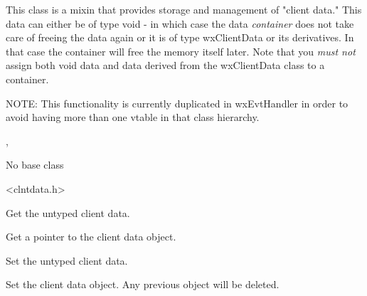 This class is a mixin that provides storage and management of "client
data." This data can either be of type void - in which case the data
{\it container} does not take care of freeing the data again
or it is of type wxClientData or its derivatives. In that case the
container will free the memory itself later.
Note that you {\it must not} assign both void data and data
derived from the wxClientData class to a container.

NOTE: This functionality is currently duplicated in wxEvtHandler in
order to avoid having more than one vtable in that class hierarchy.


, 


No base class


<clntdata.h>




\label{wxclientdatacontainerwxclientdatacontainer}



\label{wxclientdatacontainerdtor}



\label{wxclientdatacontainergetclientdata}


Get the untyped client data.

\label{wxclientdatacontainergetclientobject}


Get a pointer to the client data object.

\label{wxclientdatacontainersetclientdata}


Set the untyped client data.

\label{wxclientdatacontainersetclientobject}


Set the client data object. Any previous object will be deleted.

